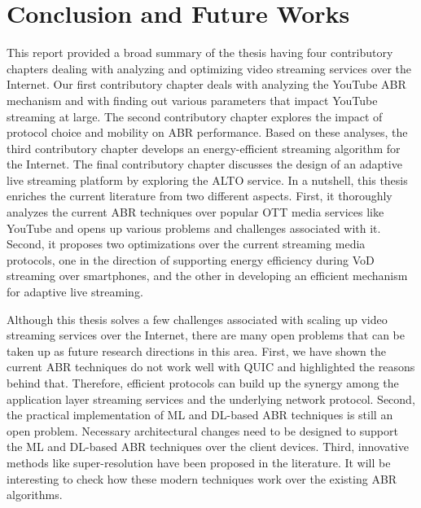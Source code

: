 \chapter{Conclusion and Future Works}
This report provided a broad summary of the thesis having four contributory chapters dealing with analyzing and optimizing video streaming services over the Internet. Our first contributory chapter deals with analyzing the YouTube ABR mechanism and with finding out various parameters that impact YouTube streaming at large. The second contributory chapter explores the impact of protocol choice and mobility on ABR performance. Based on these analyses, the third contributory chapter develops an energy-efficient streaming algorithm for the Internet. The final contributory chapter discusses the design of an adaptive live streaming platform by exploring the ALTO service. In a nutshell, this thesis enriches the current literature from two different aspects. First, it thoroughly analyzes the current ABR techniques over popular OTT media services like YouTube and opens up various problems and challenges associated with it. Second, it proposes two optimizations over the current streaming media protocols, one in the direction of supporting energy efficiency during VoD streaming over smartphones, and the other in developing an efficient mechanism for adaptive live streaming.

Although this thesis solves a few challenges associated with scaling up video streaming services over the Internet, there are many open problems that can be taken up as future research directions in this area. First, we have shown the current ABR techniques do not work well with QUIC and highlighted the reasons behind that. Therefore, efficient protocols can build up the synergy among the application layer streaming services and the underlying network protocol. Second, the practical implementation of ML and DL-based ABR techniques is still an open problem. Necessary architectural changes need to be designed to support the ML and DL-based ABR techniques over the client devices. Third, innovative methods like super-resolution have been proposed in the literature. It will be interesting to check how these modern techniques work over the existing ABR algorithms. 